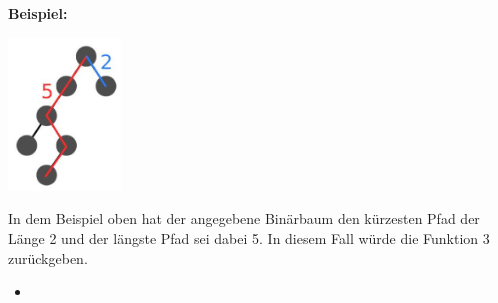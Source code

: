 \textbf{Beispiel:}

\begin{center}
  \includegraphics[width=3cm]{2022_11_23_3d3b162f8463b52386b8g-3}
\end{center}

In dem Beispiel oben hat der angegebene Binärbaum den kürzesten Pfad der Länge 2 
und der längste Pfad sei dabei 5. In diesem Fall würde die Funktion 3 zurückgeben.

\begin{itemize}
  \item []\inputminted{Haskell}{A6_5.hs}
\end{itemize}

